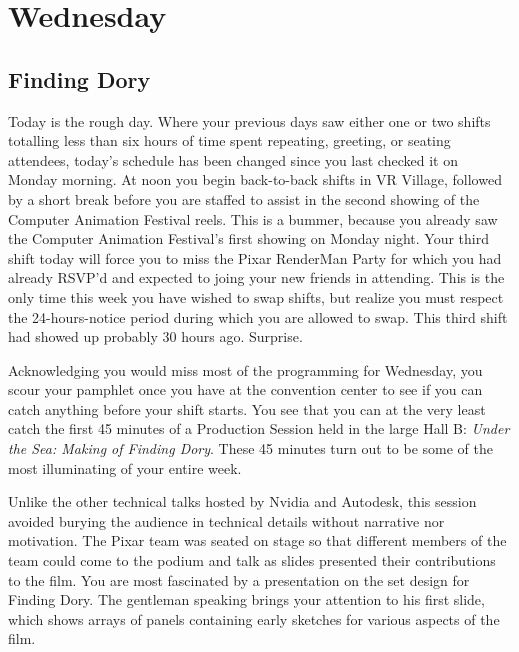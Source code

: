 \documentclass[../main.tex]{subfiles}
\begin{document}
\section{Wednesday}

\subsection{Finding Dory}

Today is the rough day. Where your previous days saw either one or two shifts totalling less than six hours of time spent repeating, greeting, or seating attendees, today's schedule has been changed since you last checked it on Monday morning. At noon you begin back-to-back shifts in VR Village, followed by a short break before you are staffed to assist in the second showing of the Computer Animation Festival reels. This is a bummer, because you already saw the Computer Animation Festival's first showing on Monday night. Your third shift today will force you to miss the Pixar RenderMan Party for which you had already RSVP'd and expected to joing your new friends in attending. This is the only time this week you have wished to swap shifts, but realize you must respect the 24-hours-notice period during which you are allowed to swap. This third shift had showed up probably 30 hours ago. Surprise.

Acknowledging you would miss most of the programming for Wednesday, you scour your pamphlet once you have at the convention center to see if you can catch anything before your shift starts.  You see that you can at the very least catch the first 45 minutes of a Production Session held in the large Hall B: \textit{Under the Sea: Making of Finding Dory}. These 45 minutes turn out to be some of the most illuminating of your entire week.

Unlike the other technical talks hosted by Nvidia and Autodesk, this session avoided burying the audience in technical details without narrative nor motivation. The Pixar team was seated on stage so that different members of the team could come to the podium and talk as slides presented their contributions to the film. You are most fascinated by a presentation on the set design for Finding Dory. The gentleman speaking brings your attention to his first slide, which shows arrays of panels containing early sketches for various aspects of the film.
\end{document}
